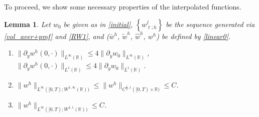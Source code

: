 \documentclass[a4paper,11pt]{article}
\newtheorem{lemma}{Lemma}[section]
\theoremstyle{remark}
\begin{document}
% 
To proceed, we show some necessary properties of the interpolated functions.
\begin{lemma} \label{misc}
Let $w_0$ be given as in \eqref{initial}, $\left\{w^j_{\ell;h}\right\}$ be the sequence generated via \eqref{vol_aver+pmf} and \eqref{RW1}, and ($\bar{w}^h$, $\tilde{w}^h$, $\hat{w}^h$, $w^h$) be defined by \eqref{linear0}.
\begin{enumerate}
 \item $\|\partial_y w^h(0,\cdot)\|_{L^\infty(\mathbb{R})} \le 4\|\partial_y w_0\|_{L^\infty(\mathbb{R})}$, $\|\partial_y w^h(0,\cdot)\|_{L^1(\mathbb{R})} \le 4\|\partial_y w_0\|_{L^1(\mathbb{R})}$.
 \item $\displaystyle \|w^h\|_{L^\infty([0,T);W^{1,\infty}(\mathbb{R}))} \le \displaystyle\|w^h\|_{C^{\frac{1}{2},1}([0,T)\times\mathbb{R})} \le C$. %
 \item $\displaystyle \|w^h\|_{L^\infty([0,T);W^{1,1}(\mathbb{R}))} \le C$.
 \end{enumerate}
\end{lemma}
\end{document}
